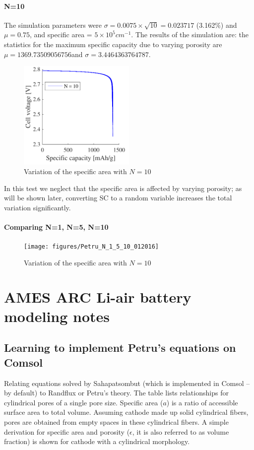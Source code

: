 \documentclass[12pt]{book}
\begin{document}
\subsubsection{N=10}
The simulation parameters were $\sigma=0.0075\times\sqrt{10}=0.023717$ (3.162\%) and $\mu=0.75$, and specific area = $5\times10^{5}cm^{-1}$. The results of the simulation are: the statistics for the maximum specific capacity due to varying porosity are $\mu=1369.73509056756$and $\sigma=3.4464363764787$.
\begin{figure}[htb]
	\centering
	\includegraphics[width=0.5\textwidth]{figures/Petru_N_10_012016}
	\caption{Variation of the specific area with $N = 10$}
\end{figure}
In this test we neglect that the specific area is affected by varying porosity; as will be shown later, converting SC to a random variable increases the total variation significantly. 

\subsubsection{Comparing N=1, N=5, N=10}
\begin{figure}[htb]
	\centering
	\texttt{[image: figures/Petru\_N\_1\_5\_10\_012016]}
	\caption{Variation of the specific area with $N = 10$}
\end{figure}
\chapter{AMES ARC Li-air battery modeling notes}
\section{Learning to implement Petru's equations on Comsol} Relating equations solved by Sahapatsombut (which is implemented in Comsol --by default) to Randflux or Petru's theory. The table lists relationships for cylindrical pores of a single pore size.
Specific area ($a$) is a ratio of accessible surface area to total volume. Assuming cathode made up solid cylindrical fibers,  pores are obtained from empty spaces in these cylindrical fibers. A simple derivation for specific area and porosity ($\epsilon$, it is also referred to as volume fraction) is shown for cathode with a cylindrical morphology.  
\end{document}
